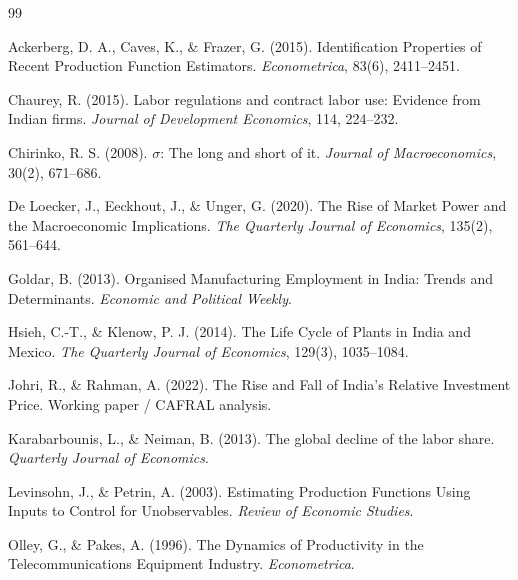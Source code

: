 \documentclass[12pt]{article}
\begin{document}
\begin{thebibliography}{99}

Ackerberg, D. A., Caves, K., \& Frazer, G. (2015).
\newblock Identification Properties of Recent Production Function Estimators.
\newblock \emph{Econometrica}, 83(6), 2411--2451.

Chaurey, R. (2015).
\newblock Labor regulations and contract labor use: Evidence from Indian firms.
\newblock \emph{Journal of Development Economics}, 114, 224--232.

Chirinko, R. S. (2008).
\newblock $\sigma$: The long and short of it.
\newblock \emph{Journal of Macroeconomics}, 30(2), 671--686.

De Loecker, J., Eeckhout, J., \& Unger, G. (2020).
\newblock The Rise of Market Power and the Macroeconomic Implications.
\newblock \emph{The Quarterly Journal of Economics}, 135(2), 561--644.

Goldar, B. (2013).
\newblock Organised Manufacturing Employment in India: Trends and Determinants.
\newblock \emph{Economic and Political Weekly}.

Hsieh, C.-T., \& Klenow, P. J. (2014).
\newblock The Life Cycle of Plants in India and Mexico.
\newblock \emph{The Quarterly Journal of Economics}, 129(3), 1035--1084.

Johri, R., \& Rahman, A. (2022).
\newblock The Rise and Fall of India's Relative Investment Price.
\newblock Working paper / CAFRAL analysis.

Karabarbounis, L., \& Neiman, B. (2013).
\newblock The global decline of the labor share.
\newblock \emph{Quarterly Journal of Economics}.

Levinsohn, J., \& Petrin, A. (2003).
\newblock Estimating Production Functions Using Inputs to Control for Unobservables.
\newblock \emph{Review of Economic Studies}.

Olley, G., \& Pakes, A. (1996).
\newblock The Dynamics of Productivity in the Telecommunications Equipment Industry.
\newblock \emph{Econometrica}.

\end{thebibliography}
\end{document}
